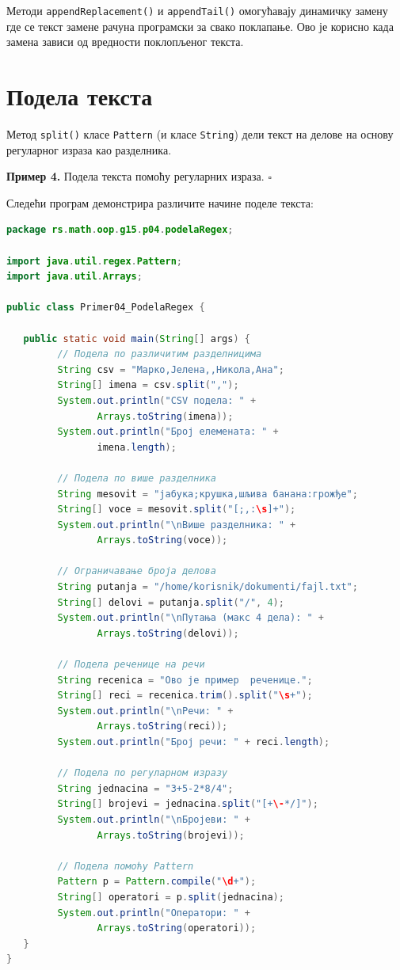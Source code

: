 Методи \texttt{appendReplacement()} и \texttt{appendTail()} омогућавају динамичку замену где се текст замене рачуна програмски за свако поклапање. Ово је корисно када замена зависи од вредности поклопљеног текста.


\section{Подела текста}

Метод \texttt{split()} класе \texttt{Pattern} (и класе \texttt{String}) дели текст на делове на основу регуларног израза као разделника.


\bigskip

\noindent \textbf{Пример 4.} Подела текста помоћу регуларних израза. $\square$

\medskip

Следећи програм демонстрира различите начине поделе текста:


\begin{lstlisting}[language=Java]
package rs.math.oop.g15.p04.podelaRegex;
 
import java.util.regex.Pattern;
import java.util.Arrays;
 
public class Primer04_PodelaRegex {
 
   public static void main(String[] args) {
         // Подела по различитим разделницима
         String csv = "Марко,Јелена,,Никола,Ана";
         String[] imena = csv.split(",");
         System.out.println("CSV подела: " +
                Arrays.toString(imena));
         System.out.println("Број елемената: " +
                imena.length);
 
         // Подела по више разделника
         String mesovit = "јабука;крушка,шљива банана:грожђе";
         String[] voce = mesovit.split("[;,:\s]+");
         System.out.println("\nВише разделника: " +
                Arrays.toString(voce));
 
         // Ограничавање броја делова
         String putanja = "/home/korisnik/dokumenti/fajl.txt";
         String[] delovi = putanja.split("/", 4);
         System.out.println("\nПутања (макс 4 дела): " +
                Arrays.toString(delovi));
 
         // Подела реченице на речи
         String recenica = "Ово је пример  реченице.";
         String[] reci = recenica.trim().split("\s+");
         System.out.println("\nРечи: " +
                Arrays.toString(reci));
         System.out.println("Број речи: " + reci.length);
 
         // Подела по регуларном изразу
         String jednacina = "3+5-2*8/4";
         String[] brojevi = jednacina.split("[+\-*/]");
         System.out.println("\nБројеви: " +
                Arrays.toString(brojevi));
 
         // Подела помоћу Pattern
         Pattern p = Pattern.compile("\d+");
         String[] operatori = p.split(jednacina);
         System.out.println("Оператори: " +
                Arrays.toString(operatori));
   }
}
\end{lstlisting}


